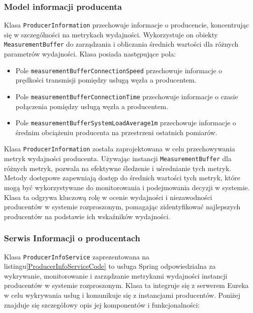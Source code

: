\subsubsection{Model informacji producenta}

Klasa \verb|ProducerInformation| przechowuje informacje o producencie, koncentrując się w szczególności na metrykach wydajności. Wykorzystuje on obiekty \verb|MeasurementBuffer| do zarządzania i obliczania średnich wartości dla różnych parametrów wydajności. Klasa posiada następujące pola:

\begin{itemize}
    \item Pole \verb|measurementBufferConnectionSpeed| przechowuje informacje o prędkości transmisji pomiędzy usługą węzła a producentem.
    \item Pole \verb|measurementBufferConnectionTime| przechowuje informacje o czasie połączenia pomiędzy usługą węzła a producentem.
    \item Pole \verb|measurementBufferSystemLoadAverage1m| przechowuje informacje o średnim obciążeniu producenta na przestrzeni ostatnich pomiarów.
\end{itemize}

Klasa \verb|ProducerInformation| została zaprojektowana w celu przechowywania metryk wydajności producenta. Używając instancji \verb|MeasurementBuffer| dla różnych metryk, pozwala na efektywne śledzenie i uśrednianie tych metryk. Metody dostępowe zapewniają dostęp do średnich wartości tych metryk, które mogą być wykorzystywane do monitorowania i podejmowania decyzji w systemie. Klasa ta odgrywa kluczową rolę w ocenie wydajności i niezawodności producentów w systemie rozproszonym, pomagając zidentyfikować najlepszych producentów na podstawie ich wskaźników wydajności.

\subsubsection{Serwis Informacji o producentach}

Klasa \verb|ProducerInfoService| zaprezentowana na listingu\ref{ProducerInfoServiceCode} to usługa Spring odpowiedzialna za wykrywanie, monitorowanie i zarządzanie metrykami wydajności instancji producentów w systemie rozproszonym. Klasa ta integruje się z serwerem Eureka w celu wykrywania usług i komunikuje się z instancjami producentów. Poniżej znajduje się szczegółowy opis jej komponentów i funkcjonalności:

